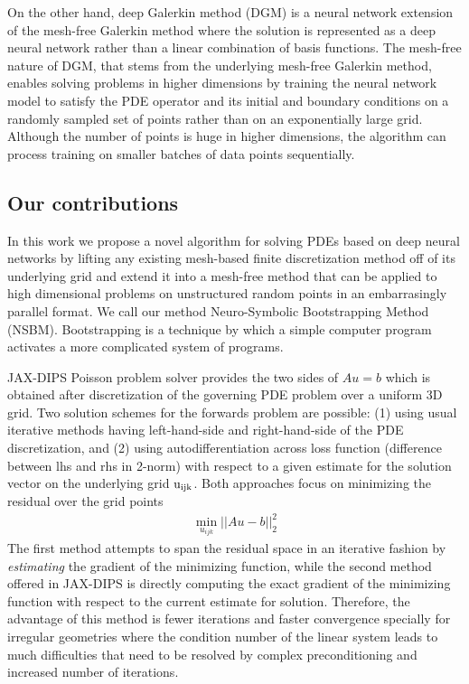 \documentclass{elsarticle}
\begin{document}
On the other hand, deep Galerkin method (DGM) \cite{SIRIGNANO20181339} is a neural network extension of the mesh-free Galerkin method where the solution is represented as a deep neural network rather than a linear combination of basis functions. The mesh-free nature of DGM, that stems from the underlying mesh-free Galerkin method, enables solving problems in higher dimensions by training the neural network model to satisfy the PDE operator and its initial and boundary conditions on a randomly sampled set of points rather than on an exponentially large grid. Although the number of points is huge in higher dimensions, the algorithm can process training on smaller batches of data points sequentially.


\subsection{Our contributions}
In this work we propose a novel algorithm for solving PDEs based on deep neural networks by lifting any existing mesh-based finite discretization method off of its underlying grid and extend it into a mesh-free method that can be applied to high dimensional problems on unstructured random points in an embarrasingly parallel format. We call our method Neuro-Symbolic Bootstrapping Method (NSBM). Bootstrapping is a technique by which a simple computer program activates a more complicated system of programs.



JAX-DIPS Poisson problem solver provides the two sides of $A u =b$ which is obtained after discretization of the governing PDE problem over a uniform 3D grid. Two solution schemes for the forwards problem are possible: (1) using usual iterative methods having left-hand-side and right-hand-side of the PDE discretization, and (2) using autodifferentiation across loss function (difference between lhs and rhs in 2-norm) with respect to a given estimate for the solution vector on the underlying grid $\rm u_{ijk}$. Both approaches focus on minimizing the residual over the grid points
\begin{align*}
	\min_{u_{ijk}} \vert\vert Au -b \vert \vert^2_2
\end{align*}
The first method attempts to span the residual space in an iterative fashion by \textit{estimating} the gradient of the minimizing function, while the second method offered in JAX-DIPS is directly computing the exact gradient of the minimizing function with respect to the current estimate for solution. Therefore, the advantage of this method is fewer iterations and faster convergence specially for irregular geometries where the condition number of the linear system leads to much difficulties that need to be resolved by complex preconditioning and increased number of iterations.
\end{document}
